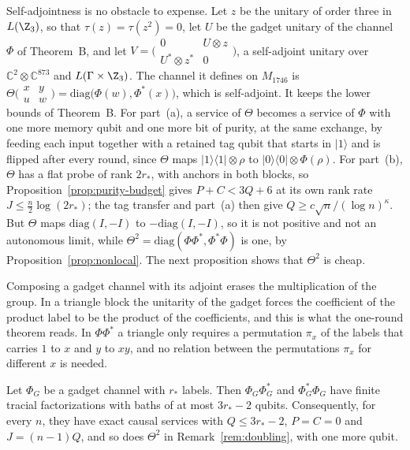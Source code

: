 \begin{remark}\label{rem:doubling}
Self-adjointness is no obstacle to expense. Let $z$ be the unitary of order three in $L(\Z_3)$, so that $\tau(z)=\tau(z^2)=0$, let $U$ be the gadget
unitary of the channel $\Phi$ of Theorem~B, and let
$V=\bigl(\begin{smallmatrix}0&U\otimes z\\U^*\otimes z^*&0\end{smallmatrix}\bigr)$, a self-adjoint unitary over $\mathbb C^2\otimes\mathbb C^{873}$ and
$L(\Gamma\times\Z_3)$. The channel it defines on $M_{1746}$ is
$\Theta\bigl(\begin{smallmatrix}x&y\\u&w\end{smallmatrix}\bigr)=\mathrm{diag}\bigl(\Phi(w),\Phi^*(x)\bigr)$, which is self-adjoint. It keeps the lower bounds of
Theorem~B. For part~(a), a service of $\Theta$ becomes a service of $\Phi$ with one more memory qubit and one more bit of purity, at the same
exchange, by feeding each input together with a retained tag qubit that starts in $|1\rangle$ and is flipped after every round, since $\Theta$ maps
$|1\rangle\langle1|\otimes\rho$ to $|0\rangle\langle0|\otimes\Phi(\rho)$. For part~(b), $\Theta$ has a flat probe of rank $2r_*$, with anchors in both blocks,
so Proposition~\ref{prop:purity-budget} gives $P+C<3Q+6$ at its own rank rate $J\le\frac n2\log(2r_*)$; the tag transfer and part~(a) then give
$Q\ge c\sqrt n/(\log n)^\kappa$. But $\Theta$ maps $\mathrm{diag}(I,-I)$ to $-\mathrm{diag}(I,-I)$, so it is not
positive and not an autonomous limit, while $\Theta^2=\mathrm{diag}(\Phi\Phi^*,\Phi^*\Phi)$ is one, by Proposition~\ref{prop:nonlocal}. The next
proposition shows that $\Theta^2$ is cheap.
\end{remark}

Composing a gadget channel with its adjoint erases the multiplication of the group. In a triangle block the unitarity of the gadget forces the
coefficient of the product label to be the product of the coefficients, and this is what the one-round theorem reads. In $\Phi\Phi^*$ a triangle only
requires a permutation $\pi_x$ of the labels that carries $1$ to $x$ and $y$ to $xy$, and no relation between the permutations $\pi_x$ for
different $x$ is needed.

\begin{proposition}\label{prop:compositions}
Let $\Phi_G$ be a gadget channel with $r_*$ labels. Then $\Phi_G\Phi_G^*$ and $\Phi_G^*\Phi_G$ have finite tracial factorizations with baths of at
most $3r_*-2$ qubits. Consequently, for every $n$, they have exact causal services with $Q\le3r_*-2$, $P=C=0$ and $J=(n-1)Q$, and so does
$\Theta^2$ in Remark~\ref{rem:doubling}, with one more qubit.
\end{proposition}

